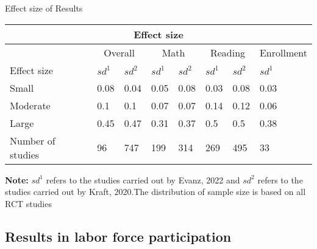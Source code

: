 \documentclass[9pt]{beamer}
\begin{document}
\begin{frame}{Effect size of Results  } \label{size}

\begin{table}[]
 
\begin{tabular}{llllllll}
\hline
\multicolumn{8}{c}{Effect size}                                                                                         \\ \hline
                  & \multicolumn{2}{c}{Overall} & \multicolumn{2}{c}{Math}  & \multicolumn{2}{c}{Reading} & Enrollment  \\ \hline
Effect size       & $sd^1$  & $sd^2$  & $sd^1$ & $sd^2$  & $sd^1$  & $sd^2$ & $sd^1$  \\
Small             & 0.08         & 0.04         & 0.05        & 0.08        & 0.03         & 0.08         & 0.03        \\
Moderate          & 0.1          & 0.1          & 0.07        & 0.07        & 0.14         & 0.12         & 0.06        \\
Large             & 0.45         & 0.47         & 0.31        & 0.37        & 0.5          & 0.5          & 0.38        \\
Number of studies & 96           & 747          & 199         & 314         & 269          & 495          & 33          \\ \hline
\end{tabular}
 
 \begin{tablenotes}
      \small
      \textbf{Note: } $sd^1$ refers to the studies carried out by Evanz, 2022 and 
      $sd^2$ refers to the studies carried out by Kraft, 2020.The distribution of sample size is based on all RCT studies  
       
    \end{tablenotes}
\end{table}
    
\end{frame}

\subsection{Results in labor force participation}
\end{document}

